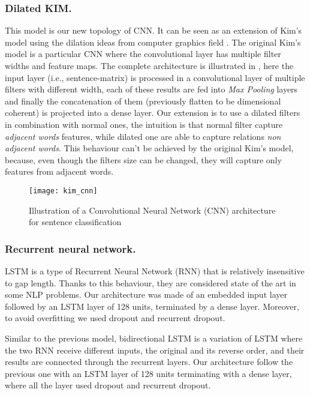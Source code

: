 \subsubsection{Dilated KIM.}
This model is our new topology of CNN. It can be seen as an extension of Kim's model \cite{kim2014convolutional} using the dilation ideas from computer graphics field \cite{yu2015multi}.
The original Kim's model is a particular CNN where the convolutional layer has multiple filter widths and feature maps.
The complete architecture is illustrated in , here the input layer (i.e., sentence-matrix) is processed in a convolutional layer of multiple filters with different width, each of these results are fed into \emph{Max Pooling} layers and finally the concatenation of them (previously flatten to be dimensional coherent) is projected into a dense layer.
Our extension is to use a dilated filters in combination with normal ones, the intuition is that normal filter capture \emph{adjacent words} features, while dilated one are able to capture relations \emph{non adjacent words}.
This behaviour can't be achieved by the original Kim's model, because, even though the filters size can be changed, they will capture only features from adjacent words.

\begin{figure}[h]
\footnotesize
\centering
\texttt{[image: kim\_cnn]}
\caption{\cite{zhang2015sensitivity} Illustration of a Convolutional Neural Network (CNN) architecture for sentence classification}
\label{fig:kim}
\end{figure}

\subsubsection{Recurrent neural network.}
LSTM is a type of Recurrent Neural Network (RNN) that is relatively insensitive to gap length. Thanks to this behaviour, they are considered state of the art in some NLP problems.
Our architecture was made of an embedded input layer followed by an LSTM layer of 128 units, terminated by a dense layer. Moreover, to avoid overfitting we used dropout and recurrent dropout.

Similar to the previous model, bidirectional LSTM is a variation of LSTM where the two RNN receive different inputs, the original and its reverse order, and their results are connected through the recurrent layers.
Our architecture follow the previous one with an LSTM layer of 128 units terminating with a dense layer, where all the layer used dropout and recurrent dropout.

